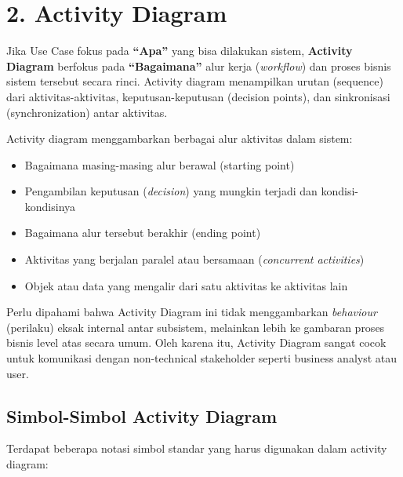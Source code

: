\documentclass[12pt,a4paper]{article}
\begin{document}
\newpage
\section{2. Activity Diagram}

Jika Use Case fokus pada \textbf{``Apa''} yang bisa dilakukan sistem, \textbf{Activity Diagram} berfokus pada \textbf{``Bagaimana''} alur kerja (\textit{workflow}) dan proses bisnis sistem tersebut secara rinci. Activity diagram menampilkan urutan (sequence) dari aktivitas-aktivitas, keputusan-keputusan (decision points), dan sinkronisasi (synchronization) antar aktivitas.

Activity diagram menggambarkan berbagai alur aktivitas dalam sistem:
\begin{itemize}
    \item Bagaimana masing-masing alur berawal (starting point)
    \item Pengambilan keputusan (\textit{decision}) yang mungkin terjadi dan kondisi-kondisinya
    \item Bagaimana alur tersebut berakhir (ending point)
    \item Aktivitas yang berjalan paralel atau bersamaan (\textit{concurrent activities})
    \item Objek atau data yang mengalir dari satu aktivitas ke aktivitas lain
\end{itemize}

Perlu dipahami bahwa Activity Diagram ini tidak menggambarkan \textit{behaviour} (perilaku) eksak internal antar subsistem, melainkan lebih ke gambaran proses bisnis level atas secara umum. Oleh karena itu, Activity Diagram sangat cocok untuk komunikasi dengan non-technical stakeholder seperti business analyst atau user.

\subsection{Simbol-Simbol Activity Diagram}

Terdapat beberapa notasi simbol standar yang harus digunakan dalam activity diagram:
\end{document}
